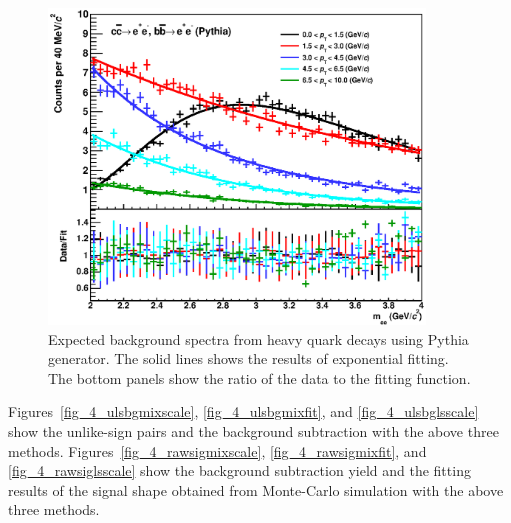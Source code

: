 {\begin{figure}[!h]
\begin{center}
        \includegraphics[width=10cm]{chap4/figure/RawYield/PythiawExpFit.eps}
   \end{center}	
   \caption{ Expected background spectra from heavy quark decays using Pythia generator. The solid lines shows the results of exponential fitting. The bottom panels show the ratio of the data to the fitting function. }
  \label{fig_4_pythiahf}
    \end{figure}

Figures~\ref{fig_4_ulsbgmixscale}, \ref{fig_4_ulsbgmixfit}, and \ref{fig_4_ulsbglsscale} show the unlike-sign pairs and the background subtraction with the above three methods. 
Figures~\ref{fig_4_rawsigmixscale}, \ref{fig_4_rawsigmixfit}, and \ref{fig_4_rawsiglsscale} show the background subtraction yield and the fitting results of the signal shape obtained from Monte-Carlo simulation with the above three methods. 

}
